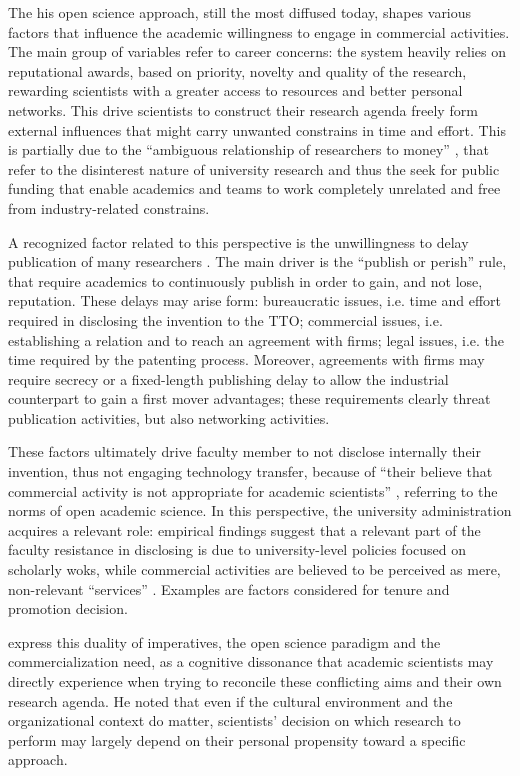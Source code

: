 The his open science approach, still the most diffused today, shapes various factors that influence the academic willingness to engage in commercial activities. The main group of variables refer to career concerns: the system heavily relies on reputational awards, based on priority, novelty and quality of the research, rewarding scientists with a greater access to resources and better personal networks. This drive scientists to construct their research agenda freely form external influences that might carry unwanted constrains in time and effort. This is partially due to the \enquote{ambiguous relationship of researchers to money} \citep{OShea2004}, that refer to the disinterest nature of university research and thus the seek for public funding that enable academics and teams to work completely unrelated and free from industry-related constrains. 

A recognized factor related to this perspective is the unwillingness to delay publication of many researchers \citep{OShea2004, Thursby2002, Baldini2007}. The main driver is the \enquote{publish or perish} rule, that require academics to continuously publish in order to gain, and not lose, reputation. These delays may arise form: bureaucratic issues, i.e. time and effort required in disclosing the invention to the TTO; commercial issues, i.e. establishing a relation and to reach an agreement with firms; legal issues, i.e. the time required by the patenting process. Moreover, agreements with firms may require secrecy or a fixed-length publishing delay to allow the industrial counterpart to gain a first mover advantages; these requirements clearly threat publication activities, but also networking activities. 

These factors ultimately drive faculty member to not disclose internally their invention, thus not engaging technology transfer, because of \enquote{their believe that commercial activity is not appropriate for academic scientists} \citep{Bercovitz2006}, referring to the norms of open academic science.  In this perspective, the university administration acquires a relevant role: empirical findings suggest that a relevant part of the faculty resistance in disclosing is due to university-level policies focused on scholarly woks, while commercial activities are believed to be perceived as mere, non-relevant \enquote{services} \citep{Markman2005}. Examples are factors considered for tenure and promotion decision.

\citet{Muscio2013} express this duality of imperatives, the open science paradigm and the commercialization need, as a cognitive dissonance that academic scientists may directly experience when trying to reconcile these conflicting aims and their own research agenda. He noted that even if the cultural environment and the organizational context do matter, scientists' decision on which research to perform may largely depend on their personal propensity toward a specific approach.

